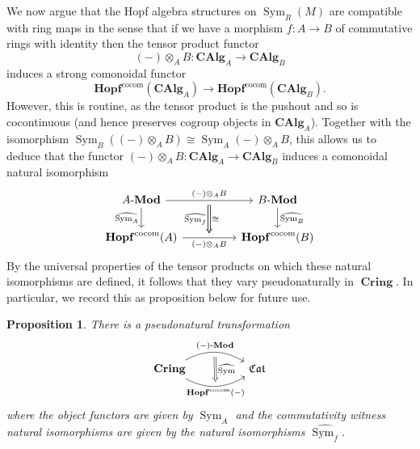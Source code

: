 \documentclass{amsart}
\newtheorem{proposition}[equation]{Proposition}
\theoremstyle{definition}
\DeclareMathOperator{\sym}{Sym}
\DeclareMathOperator{\Cring}{\mathbf{Cring}}
\DeclareMathOperator{\fCat}{\mathfrak{Cat}}
\newcommand{\CAlg}[1]{\mathbf{CAlg}_{#1}}
\newcommand{\Sym}[1]{\sym_{#1}}
\newcommand{\Mod}[1]{{#1}\textnormal{-}\mathbf{Mod}}
\numberwithin{equation}{subsection}
\begin{document}
We now argue that the Hopf algebra structures on $\Sym{R}(M)$ are compatible with ring maps in the sense that if we have a morphism $f:A \to B$ of commutative rings with identity then the tensor product functor
\[
(-) \otimes_A B: \CAlg{A} \to \CAlg{B}
\]
induces a strong comonoidal functor
\[
\mathbf{Hopf}^{\operatorname{cocom}}(\CAlg{A}) \to \mathbf{Hopf}^{\operatorname{cocom}}(\CAlg{B}).
\]
However, this is routine, as the tensor product is the pushout and so is cocontinuous (and hence preserves cogroup objects in $\CAlg{A}$). Together with the isomorphism $\Sym{B}((-) \otimes_A B) \cong \Sym{A}(-) \otimes_A B$, this allows us to deduce that the functor $(-) \otimes_A B:\CAlg{A} \to \CAlg{B}$ induces a comonoidal natural isomorphism
\[
\begin{tikzcd}
\Mod{A} \ar[rr, ""{name= U}]{}{(-) \otimes_A B} \ar[d, swap]{}{\widehat{\Sym{A}}} & & \Mod{B} \ar[d]{}{\widehat{\Sym{B}}} \\
\mathbf{Hopf}^{\operatorname{cocom}}(A) \ar[rr, swap, ""{name = D}]{}{(-) \otimes_A B} & & \mathbf{Hopf}^{\operatorname{cocom}}(B)
\ar[from = U, to = D, Rightarrow, shorten <= 4pt, shorten >= 4pt]{}{\cong}
\ar[from = U, to = D, Rightarrow, shorten <= 4pt, shorten >= 4pt, swap]{}{\widehat{\Sym{f}}}
\end{tikzcd}
\]
By the universal properties of the tensor products on which these natural isomorphisms are defined, it follows that they vary pseudonaturally in $\Cring$. In particular, we record this as proposition below for future use.

\begin{proposition}\label{Prop: Section Background Alg: Sym Hopf Structure Pseudonatural}
There is a pseudonatural transformation
\[
\begin{tikzcd}
\Cring \ar[rr, bend left = 30, ""{name = U}]{}{\Mod{(-)}} \ar[rr, bend right = 30, swap, ""{name = D}]{}{\mathbf{Hopf}^{\operatorname{cocom}}(-)} & & \fCat
\ar[from = U, to = D, Rightarrow, shorten <= 4pt, shorten >= 4pt]{}{\widehat{\sym}}
\end{tikzcd}
\]
where the object functors are given by $\widehat{\Sym{A}}$ and the commutativity witness natural isomorphisms are given by the natural isomorphisms $\widehat{\Sym{f}}$.
\end{proposition}
\end{document}
